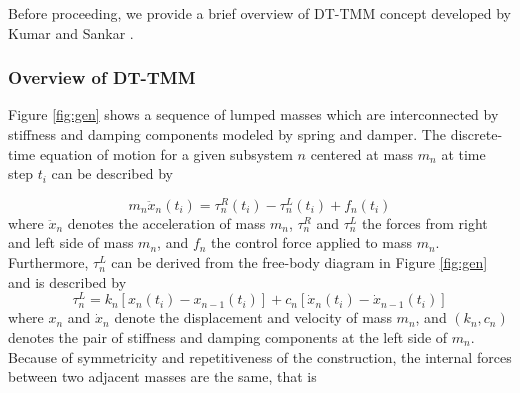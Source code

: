 \documentclass[11pt]{ucthesis}
\newcommand{\beq}{\begin{equation}}
\newcommand{\eeq}{\end{equation}}
\begin{document}
Before proceeding, we provide a brief overview of DT-TMM concept developed by Kumar and Sankar \cite{kumar1986new}.   

\subsubsection{Overview of DT-TMM}
\label{dt-tmm}
Figure \ref{fig:gen} shows a sequence of lumped masses which are interconnected by stiffness and damping components modeled by spring and damper. The discrete-time equation of motion for a given subsystem $n$ centered at mass $m_n$ at time step $t_i$ can be described by \cite{kumar1986new}

\beq \label{eqn:nEOM}
m_n \ddot{x}_n (t_i)=\tau^R_n(t_i)-\tau^L_n(t_i)+f_n(t_i)
\eeq
where $\ddot{x}_n$ denotes the acceleration of mass $m_n$, $\tau^{R}_{n}$ and $\tau^{L}_{n}$ the forces from right and left side of mass $m_n$, and $f_n$ the control force applied to mass $m_n$. Furthermore, $\tau^{L}_{n}$ can be derived from the free-body diagram in Figure \ref{fig:gen} and is described by
\beq
\tau_n^L = k_n \left[x_n(t_i)-x_{n-1}(t_i)\right]+c_n \left[\dot{x}_n(t_i)-\dot{x}_{n-1}(t_i) \right]
\eeq
where ${x}_n$ and $\dot{x}_n$ denote the displacement and velocity of mass $m_n$, and $(k_n,c_n)$ denotes the pair of stiffness and damping components at the left side of $m_n$. Because of symmetricity and repetitiveness of the construction, the internal forces between two adjacent masses are the same, that is
\end{document}
